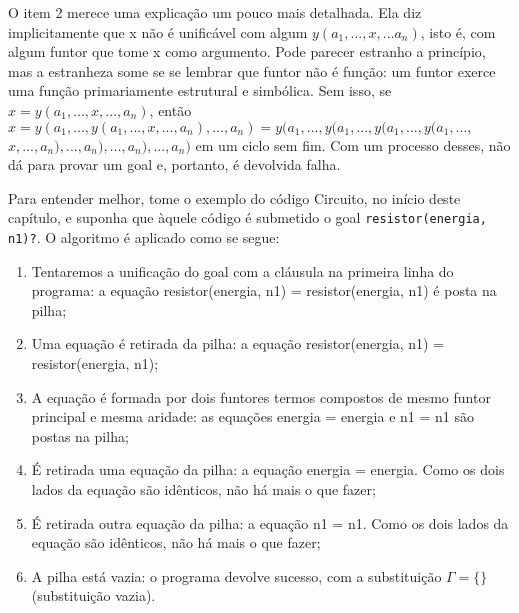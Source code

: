 \documentclass{article}
\theoremstyle{remark}
\theoremstyle{theorem}
\begin{document}
O item 2 %
merece uma explicação um pouco mais detalhada. Ela diz implicitamente que x não é unificável com algum $y(a_1, ...,x, ...a_n)$, isto é, com algum funtor que tome x como argumento. Pode parecer estranho a princípio, mas a estranheza some se se lembrar que funtor não é função: um funtor exerce uma função primariamente estrutural e simbólica. Sem isso, se $x = y(a_1, ..., x, ..., a_n)$, então $x = y(a_1, ...,y(a_1, ..., x, ..., a_n) , ..., a_n) = y(a_1, ...,y(a_1, ...,y(a_1, ...,y(a_1,
...,$
$x, ..., a_n) , ..., a_n) , ..., a_n) , ..., a_n)$ em um ciclo sem fim. Com um processo desses, não dá para provar um goal e, portanto, é devolvida falha.

Para entender melhor, tome o exemplo do código Circuito, no início deste capítulo, e suponha que àquele código é submetido o goal {\tt resistor(energia, n1)?}. O algoritmo é aplicado como se segue:

  \begin{enumerate}
    \item Tentaremos a unificação do goal com a cláusula na primeira linha do programa: a equação resistor(energia, n1) = resistor(energia, n1) é posta na pilha;
    \item Uma equação é retirada da pilha: a equação resistor(energia, n1) = resistor(energia, n1);
    \item A equação é formada por dois funtores termos compostos de mesmo funtor principal e mesma aridade: as equações energia  = energia e n1 = n1 são postas na pilha;
    \item É retirada uma equação da pilha: a equação energia = energia. Como os dois lados da equação são idênticos, não há mais o que fazer;
    \item É retirada outra equação da pilha: a equação n1 = n1. Como os dois lados da equação são idênticos, não há mais o que fazer;
    \item A pilha está vazia: o programa devolve sucesso, com a substituição $\Gamma = \{\}$ (substituição vazia).
  \end{enumerate}
\end{document}
